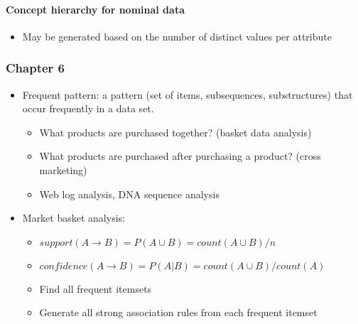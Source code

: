 \documentclass[11pt]{article}
\providecommand{\tightlist}{%
      \setlength{\itemsep}{0pt}\setlength{\parskip}{0pt}}
\begin{document}
    \paragraph{Concept hierarchy for nominal
data}\label{concept-hierarchy-for-nominal-data}

    \begin{itemize}
\tightlist
\item
  May be generated based on the number of distinct values per attribute
\end{itemize}

    \subsubsection{Chapter 6}\label{chapter-6}

    \begin{itemize}
\tightlist
\item
  Frequent pattern: a pattern (set of items, subsequences,
  substructures) that occur frequently in a data set.

  \begin{itemize}
  \tightlist
  \item
    What products are purchased together? (basket data analysis)
  \item
    What products are purchased after purchasing a product? (cross
    marketing)
  \item
    Web log analysis, DNA sequence analysis
  \end{itemize}
\end{itemize}

    \begin{itemize}
\tightlist
\item
  Market basket analysis:

  \begin{itemize}
  \tightlist
  \item
    \(support(A \rightarrow B) = P(A \cup B) = count(A \cup B) / n\)
  \item
    \(confidence(A \rightarrow B) = P(A | B) = count(A \cup B) / count(A)\)
  \item
    Find all frequent itemsets
  \item
    Generate all strong association rules from each frequent itemset
  \end{itemize}
\end{itemize}
\end{document}

